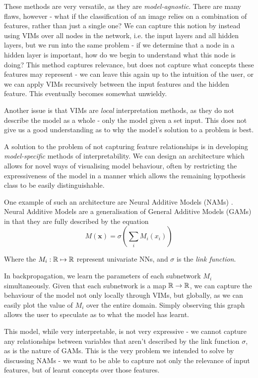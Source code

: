 \documentclass[conference]{report}
\begin{document}
These methods are very versatile, as they are \textit{model-agnostic}. There are many flaws, however - what if the classification of an image relies on a combination of features, rather than just a single one? We can capture this notion by instead using VIMs over all nodes in the network, i.e. the input layers and all hidden layers, but we run into the same problem - if we determine that a node in a hidden layer is important, how do we begin to understand what this node is doing? This method captures relevance, but does not capture what concepts these features may represent - we can leave this again up to the intuition of the user, or we can apply VIMs recursively between the input features and the hidden feature. This eventually becomes somewhat unwieldy. 

Another issue is that VIMs are \textit{local} interpretation methods, as they do not describe the model as a whole - only the model given a set input. This does not give us a good understanding as to why the model's solution to a problem is best.

A solution to the problem of not capturing feature relationships is in developing \textit{model-specific} methods of interpretability. We can design an architecture which allows for novel ways of visualising model behaviour, often by restricting the expressiveness of the model in a manner which allows the remaining hypothesis class to be easily distinguishable. 

One example of such an architecture are Neural Additive Models (NAMs) \cite{neuraladditive}. Neural Additive Models are a generalisation of General Additive Models (GAMs) in that they are fully described by the equation
$$M(\mathbf{x}) = \sigma\left(\sum_i M_i(x_i)\right)$$

Where the $M_i:\mathbb{R} \mapsto \mathbb{R}$ represent univariate NNs, and $\sigma$ is the \textit{link function}.

In backpropagation, we learn the parameters of each subnetwork $M_i$ simultaneously. Given that each subnetwork is a map $\mathbb{R} \to \mathbb{R}$, we can capture the behaviour of the model not only locally through VIMs, but globally, as we can easily plot the value of $M_i$ over the entire domain. Simply observing this graph allows the user to speculate as to what the model has learnt.

This model, while very interpretable, is not very expressive - we cannot capture any relationships between variables that aren't described by the link function $\sigma$, as is the nature of GAMs. This is the very problem we intended to solve by discussing NAMs - we want to be able to capture not only the relevance of input features, but of learnt concepts over those features.
\end{document}

